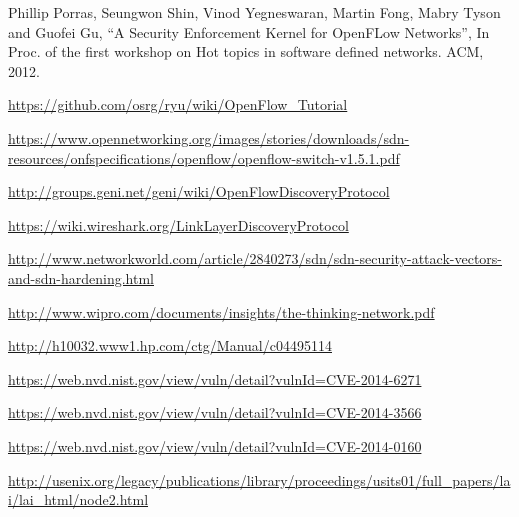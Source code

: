 \begin{thebibliography}{1}
Phillip Porras, Seungwon Shin, Vinod Yegneswaran, Martin Fong, Mabry Tyson and Guofei Gu,
``A Security Enforcement Kernel for OpenFLow Networks'', In Proc. of the first workshop on Hot topics in software defined networks. ACM, 2012.

\url{https://github.com/osrg/ryu/wiki/OpenFlow_Tutorial}

\url{https://www.opennetworking.org/images/stories/downloads/sdn-resources/onfspecifications/openflow/openflow-switch-v1.5.1.pdf}

\url{http://groups.geni.net/geni/wiki/OpenFlowDiscoveryProtocol}

\url{https://wiki.wireshark.org/LinkLayerDiscoveryProtocol}

\url{http://www.networkworld.com/article/2840273/sdn/sdn-security-attack-vectors-and-sdn-hardening.html}

\url{http://www.wipro.com/documents/insights/the-thinking-network.pdf}

\url{http://h10032.www1.hp.com/ctg/Manual/c04495114}

\url{https://web.nvd.nist.gov/view/vuln/detail?vulnId=CVE-2014-6271}

\url{https://web.nvd.nist.gov/view/vuln/detail?vulnId=CVE-2014-3566}

\url{https://web.nvd.nist.gov/view/vuln/detail?vulnId=CVE-2014-0160}

\url{http://usenix.org/legacy/publications/library/proceedings/usits01/full_papers/lai/lai_html/node2.html}

\end{thebibliography}